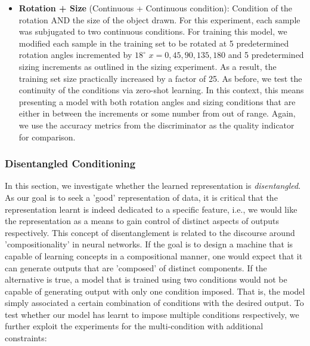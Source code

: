 \documentclass[11pt, letterpaper, oneside]{article}
\begin{document}
\begin{itemize}
    \item \textbf{Rotation + Size} (Continuous + Continuous condition): Condition of the rotation AND the size of the object drawn. \newline
    For this experiment, each sample was subjugated to two continuous conditions. For training this model, we modified each sample in the training set to be rotated at 5 predetermined rotation angles incremented by $18^{\circ}$ $x={0, 45, 90, 135, 180}$ and 5 predetermined sizing increments as outlined in the sizing experiment. As a result, the training set size practically increased by a factor of 25. As before, we test the continuity of the conditions via zero-shot learning. In this context, this means presenting a model with both rotation angles and sizing conditions that are either in between the increments or some number from out of range. Again, we use the accuracy metrics from the discriminator as the quality indicator for comparison.
    
\end{itemize}


\subsubsection{Disentangled Conditioning}
In this section, we investigate whether the learned representation is \textit{disentangled}. As our goal is to seek a 'good' representation of data, it is critical that the representation learnt is indeed dedicated to a specific feature, i.e., we would like the representation as a means to gain control of distinct aspects of outputs respectively. \newline
This concept of disentanglement is related to the discourse around 'compositionality' in neural networks. If the goal is to design a machine that is capable of learning concepts in a compositional manner, one would expect that it can generate outputs that are 'composed' of distinct components. If the alternative is true, a model that is trained using two conditions would not be capable of generating output with only one condition imposed. That is, the model simply associated a certain combination of conditions with the desired output. To test whether our model has learnt to impose multiple conditions respectively, we further exploit the experiments for the multi-condition with additional constraints:
\end{document}
